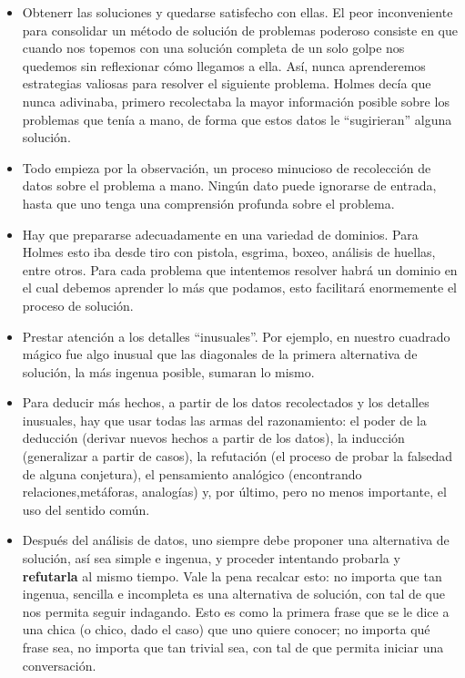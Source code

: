 \begin{itemize}


\item Obtenerr las soluciones y quedarse satisfecho con ellas. El peor 
inconveniente para consolidar un método de solución de problemas 
poderoso consiste en que cuando nos topemos con una solución completa de 
un solo golpe nos quedemos sin reflexionar cómo llegamos a ella. Así, nunca
aprenderemos estrategias valiosas para resolver el siguiente problema. 
Holmes decía que nunca adivinaba, primero
recolectaba la mayor información posible sobre los problemas
que tenía a mano, de forma que estos datos le ``sugirieran'' alguna
solución.

\item Todo empieza por la observación, un proceso minucioso de recolección
de datos sobre el problema a mano. Ningún dato puede ignorarse de entrada,
hasta que uno tenga una comprensión profunda sobre el problema.

\item Hay que prepararse adecuadamente en una variedad de dominios. Para Holmes
esto iba desde tiro con pistola, esgrima, boxeo, análisis de huellas, entre otros.
Para cada problema que intentemos resolver habrá un dominio en el cual debemos
aprender lo más que podamos, esto facilitará enormemente el proceso de solución.


\item Prestar atención a los detalles ``inusuales''. Por ejemplo, en nuestro cuadrado  mágico
 fue algo inusual que las diagonales de la primera alternativa de 
solución, la más ingenua posible, sumaran lo mismo. 

\item Para  deducir más hechos, a partir de los datos recolectados y los detalles
inusuales, hay que usar todas las armas del razonamiento: el poder de la deducción 
(derivar nuevos hechos a partir de los datos), la inducción (generalizar a partir de casos), 
la refutación (el proceso de probar la falsedad de alguna conjetura), el pensamiento 
analógico (encontrando relaciones,metáforas, analogías) y, por último, pero no 
menos importante, el uso del sentido común.

 \item Después del análisis de datos, uno siempre debe proponer una alternativa de solución, 
así sea simple e ingenua, y proceder intentando probarla y {\bf refutarla}
al mismo tiempo. Vale la pena recalcar esto: no importa que tan ingenua, sencilla
e incompleta es una alternativa de solución, con tal de que nos permita seguir
indagando. Esto es como la primera frase que se le dice a una chica (o chico,
dado el caso) que uno quiere conocer; no importa qué frase sea, no importa que
tan trivial sea, con tal de que permita iniciar una conversación.


\end{itemize}
